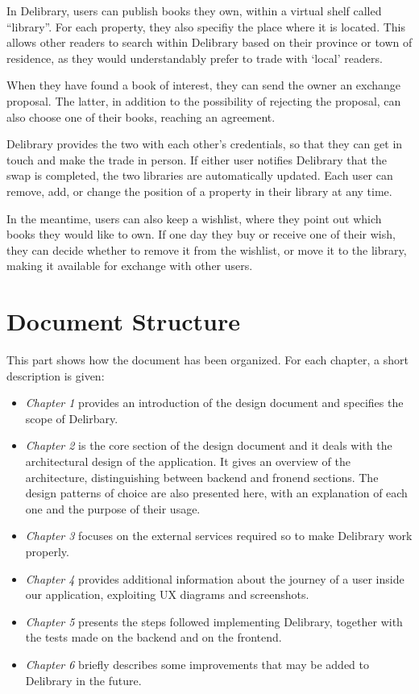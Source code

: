 \clearpage
In Delibrary, users can publish books they own, within a virtual shelf called ``library''.
For each property, they also specifiy the place where it is located. This allows other readers to search within Delibrary based on their province or town of residence,
as they would understandably prefer to trade with `local' readers.

When they have found a book of interest, they can send the owner an exchange proposal. The latter, in addition to the possibility of rejecting the proposal, can also choose one of their books, reaching an agreement.

Delibrary provides the two with each other's credentials, so that they can get in touch and make the trade in person. If either user notifies Delibrary that the swap is completed, the two libraries are automatically updated.
Each user can remove, add, or change the position of a property in their library at any time.

In the meantime, users can also keep a wishlist, where they point out which books they would like to own.
If one day they buy or receive one of their wish, they can decide whether to remove it from the wishlist, or move it to the library, making it available for exchange with other users.

\section{Document Structure}
This part shows how the document has been organized.
For each chapter, a short description is given:
\begin{itemize}
      \item \textit{Chapter 1} provides an introduction of the design document and specifies the scope of Delirbary.
      \item \textit{Chapter 2} is the core section of the design document and it deals with the architectural design of the application.
            It gives an overview of the architecture, distinguishing between backend and fronend sections.
            The design patterns of choice are also presented here, with an explanation of each one and the purpose of their usage.
      \item \textit{Chapter 3} focuses on the external services required so to make Delibrary work properly.
      \item \textit{Chapter 4} provides additional information about the journey of a user inside our application, exploiting UX diagrams and screenshots.
      \item \textit{Chapter 5} presents the steps followed implementing Delibrary, together with the tests made on the backend and on the frontend.
      \item \textit{Chapter 6} briefly describes some improvements that may be added to Delibrary in the future.
\end{itemize}



